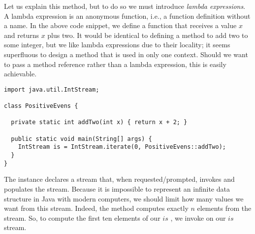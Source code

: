 Let us explain this method, but to do so we must introduce \textit{lambda expressions}. A lambda expression is an anonymous function, i.e., a function definition without a name. In the above code snippet, we define a function that receives a value $x$ and returns $x$ plus two. It would be identical to defining a  method to add two to some integer, but we like lambda expressions due to their locality; it seems superfluous to design a method that is used in only one context. Should we want to pass a method reference rather than a lambda expression, this is easily achievable.
\begin{cl}[]{}
\begin{lstlisting}[language=MyJava]
import java.util.IntStream;

class PositiveEvens {

  private static int addTwo(int x) { return x + 2; }

  public static void main(String[] args) {
    IntStream is = IntStream.iterate(0, PositiveEvens::addTwo);
  }
}   
\end{lstlisting}
\end{cl}

The  instance declares a stream that, when requested/prompted, invokes and populates the stream. Because it is impossible to represent an infinite data structure in Java with modern computers, we should limit how many values we want from this stream. Indeed, the  method computes exactly $n$ elements from the stream. So, to compute the first ten elements of our $\textit{is}$ , we invoke  on our $\textit{is}$ stream. 

